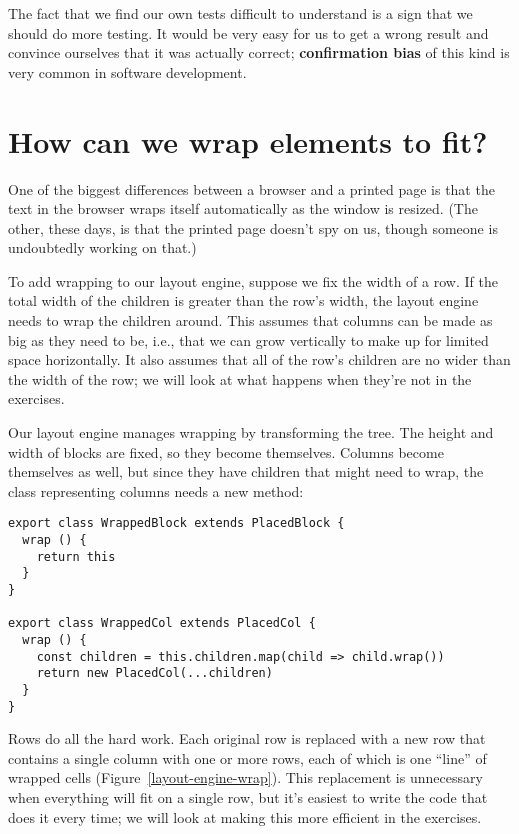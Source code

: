 \documentclass[krantzl]{krantz}
\newcommand{\figref}[1]{Figure~\ref{#1}}
\newcommand{\glossref}[1]{\textbf{#1}}
\begin{document}
\noindent The fact that we find our own tests difficult to understand
is a sign that we should do more testing.
It would be very easy for us to get a wrong result
and convince ourselves that it was actually correct;
\glossref{confirmation bias} of this kind
is very common in software development.

\section{How can we wrap elements to fit?}\label{layout-engine-fit}


One of the biggest differences between a browser and a printed page
is that the text in the browser wraps itself automatically as the window is resized.
(The other, these days, is that the printed page doesn’t spy on us,
though someone is undoubtedly working on that.)


To add wrapping to our layout engine,
suppose we fix the width of a row.
If the total width of the children is greater than the row’s width,
the layout engine needs to wrap the children around.
This assumes that columns can be made as big as they need to be,
i.e.,
that we can grow vertically to make up for limited space horizontally.
It also assumes that all of the row’s children are no wider than the width of the row;
we will look at what happens when they’re not in the exercises.


Our layout engine manages wrapping by transforming the tree.
The height and width of blocks are fixed,
so they become themselves.
Columns become themselves as well,
but since they have children that might need to wrap,
the class representing columns needs a new method:


\begin{lstlisting}[frame=tblr]
export class WrappedBlock extends PlacedBlock {
  wrap () {
    return this
  }
}

export class WrappedCol extends PlacedCol {
  wrap () {
    const children = this.children.map(child => child.wrap())
    return new PlacedCol(...children)
  }
}
\end{lstlisting}



Rows do all the hard work.
Each original row is replaced with a new row that contains a single column with one or more rows,
each of which is one “line” of wrapped cells
(\figref{layout-engine-wrap}).
This replacement is unnecessary when everything will fit on a single row,
but it’s easiest to write the code that does it every time;
we will look at making this more efficient in the exercises.
\end{document}

